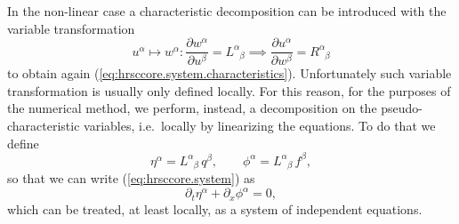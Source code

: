 In the non-linear case a characteristic decomposition can be introduced with the
variable transformation
\[
  u^\alpha \mapsto w^\alpha \colon \frac{\partial w^\alpha}{\partial u^\beta} =
  L^\alpha_{\phantom{\alpha}\beta} \implies \frac{\partial u^\alpha}{\partial
  w^\beta} = R^\alpha_{\phantom{\alpha}\beta}
\]
to obtain again (\ref{eq:hrsccore.system.characteristics}). Unfortunately such
variable transformation is usually only defined locally. For this reason, for
the purposes of the numerical method, we perform, instead, a decomposition on
the pseudo-characteristic variables, i.e.~locally by linearizing the equations.
To do that we define
\[
  \eta^\alpha = L^\alpha_{\phantom{\alpha}\beta}\, q^\beta, \qquad
  \phi^\alpha = L^\alpha_{\phantom{\alpha}\beta}\, f^\beta,
\]
so that we can write (\ref{eq:hrsccore.system}) as
\begin{equation}\label{eq:hrsccore.system.diag}
  \partial_t \eta^\alpha + \partial_x \phi^\alpha = 0,
\end{equation}
which can be treated, at least locally, as a system of independent equations.

